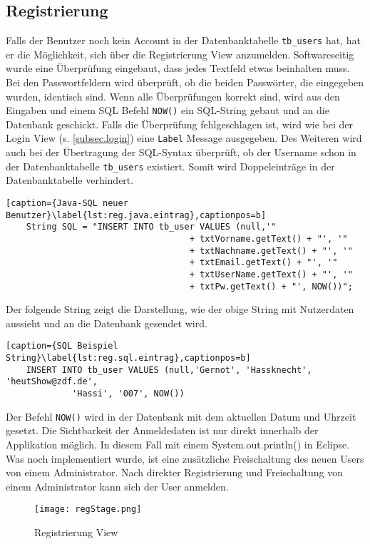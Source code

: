 \subsection{Registrierung}
\label{subsec.registrierung}
Falls der Benutzer noch kein Account in der Datenbanktabelle \texttt{tb\_users} hat, hat er die Möglichkeit, sich über die Registrierung View anzumelden. Softwareseitig wurde eine Überprüfung eingebaut, dass jedes Textfeld etwas beinhalten muss. Bei den Passwortfeldern wird überprüft, ob die beiden Passwörter, die eingegeben wurden, identisch sind. Wenn alle Überprüfungen korrekt sind, wird aus den Eingaben und einem SQL Befehl \texttt{NOW()} ein SQL-String gebaut und an die Datenbank geschickt.  Falls die Überprüfung fehlgeschlagen ist, wird wie bei der Login View (s. \ref{subsec.login}) eine \texttt{Label} Message ausgegeben. Des Weiteren wird auch bei der Übertragung der SQL-Syntax überprüft, ob der Username schon in der Datenbanktabelle \texttt{tb\_users} existiert. Somit wird Doppeleinträge in der Datenbanktabelle verhindert.
\begin{lstlisting}[caption={Java-SQL neuer Benutzer}\label{lst:reg.java.eintrag},captionpos=b]
	String SQL = "INSERT INTO tb_user VALUES (null,'"
									+ txtVorname.getText() + "', '"
									+ txtNachname.getText() + "', '"
									+ txtEmail.getText() + "', '"
									+ txtUserName.getText() + "', '"
									+ txtPw.getText() + "', NOW())";
\end{lstlisting}
Der folgende String zeigt die Darstellung, wie der obige String mit Nutzerdaten aussieht und an die Datenbank gesendet wird.
\begin{lstlisting}[caption={SQL Beispiel String}\label{lst:reg.sql.eintrag},captionpos=b]
	INSERT INTO tb_user VALUES (null,'Gernot', 'Hassknecht', 'heutShow@zdf.de',
			 'Hassi', '007', NOW())
\end{lstlisting}

Der Befehl \texttt{NOW()} wird in der Datenbank mit dem aktuellen Datum und Uhrzeit gesetzt.
Die Sichtbarkeit der Anmeldedaten ist nur direkt innerhalb der Applikation möglich. In diesem Fall mit einem System.out.println() in Eclipse. Was noch  implementiert wurde, ist eine zusätzliche Freischaltung des neuen Users von einem Administrator. Nach direkter Registrierung und Freischaltung von einem Administrator kann sich der User anmelden.
\begin{figure}[h]
  \begin{center}
    \texttt{[image: regStage.png]}
  		  \caption{Registrierung View}
     \label{fig.RegistrierungFenster}
  \end{center}
\end{figure}

